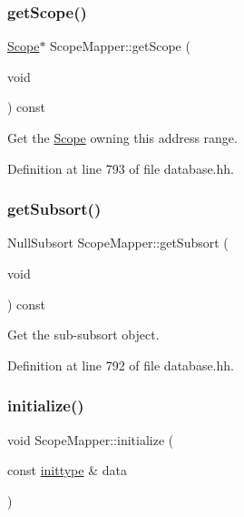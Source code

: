\mbox{\label{class_scope_mapper_a23c2829e2b4151d867eb53fe54e72423}} 
\subsubsection{\texorpdfstring{getScope()}{getScope()}}
{\footnotesize\ttfamily \mbox{\hyperlink{class_scope}{Scope}}$\ast$ Scope\+Mapper\+::get\+Scope (\begin{DoxyParamCaption}\item[{void}]{ }\end{DoxyParamCaption}) const\hspace{0.3cm}{\ttfamily [inline]}}



Get the \mbox{\hyperlink{class_scope}{Scope}} owning this address range. 



Definition at line 793 of file database.\+hh.

\mbox{\label{class_scope_mapper_a13857db9bed82727ea59305a39f1b35a}} 
\subsubsection{\texorpdfstring{getSubsort()}{getSubsort()}}
{\footnotesize\ttfamily Null\+Subsort Scope\+Mapper\+::get\+Subsort (\begin{DoxyParamCaption}\item[{void}]{ }\end{DoxyParamCaption}) const\hspace{0.3cm}{\ttfamily [inline]}}



Get the sub-\/subsort object. 



Definition at line 792 of file database.\+hh.

\mbox{\label{class_scope_mapper_a755dd2d2f55d82e07682375f3de2a54c}} 
\subsubsection{\texorpdfstring{initialize()}{initialize()}}
{\footnotesize\ttfamily void Scope\+Mapper\+::initialize (\begin{DoxyParamCaption}\item[{const \mbox{\hyperlink{class_scope_mapper_a021edc02284840d933cb7a3217a292ad}{inittype}} \&}]{data }\end{DoxyParamCaption})\hspace{0.3cm}{\ttfamily [inline]}}



